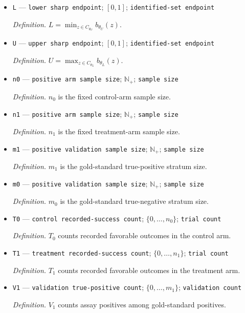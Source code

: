 \documentclass{article}
\begin{document}
\begin{itemize}
  \item \texttt{L} --- \texttt{lower sharp endpoint}; \([0,1]\); \texttt{identified-\allowbreak{}set endpoint}
  \par\smallskip\noindent\emph{Definition.} \(L=\min_{z\in C_{\theta_U}}b_{\theta_U}(z)\).
  \item \texttt{U} --- \texttt{upper sharp endpoint}; \([0,1]\); \texttt{identified-\allowbreak{}set endpoint}
  \par\smallskip\noindent\emph{Definition.} \(U=\max_{z\in C_{\theta_L}}b_{\theta_L}(z)\).
  \item \texttt{n0} --- \texttt{positive arm sample size}; \(\mathbb N_{+}\); \texttt{sample size}
  \par\smallskip\noindent\emph{Definition.} \(n_0\) is the fixed control-arm sample size.
  \item \texttt{n1} --- \texttt{positive arm sample size}; \(\mathbb N_{+}\); \texttt{sample size}
  \par\smallskip\noindent\emph{Definition.} \(n_1\) is the fixed treatment-arm sample size.
  \item \texttt{m1} --- \texttt{positive validation sample size}; \(\mathbb N_{+}\); \texttt{sample size}
  \par\smallskip\noindent\emph{Definition.} \(m_1\) is the gold-standard true-positive stratum size.
  \item \texttt{m0} --- \texttt{positive validation sample size}; \(\mathbb N_{+}\); \texttt{sample size}
  \par\smallskip\noindent\emph{Definition.} \(m_0\) is the gold-standard true-negative stratum size.
  \item \texttt{T0} --- \texttt{control recorded-\allowbreak{}success count}; \(\{0,\ldots,n_0\}\); \texttt{trial count}
  \par\smallskip\noindent\emph{Definition.} \(T_0\) counts recorded favorable outcomes in the control arm.
  \item \texttt{T1} --- \texttt{treatment recorded-\allowbreak{}success count}; \(\{0,\ldots,n_1\}\); \texttt{trial count}
  \par\smallskip\noindent\emph{Definition.} \(T_1\) counts recorded favorable outcomes in the treatment arm.
  \item \texttt{V1} --- \texttt{validation true-\allowbreak{}positive count}; \(\{0,\ldots,m_1\}\); \texttt{validation count}
  \par\smallskip\noindent\emph{Definition.} \(V_1\) counts assay positives among gold-standard positives.

\end{itemize}
\end{document}

